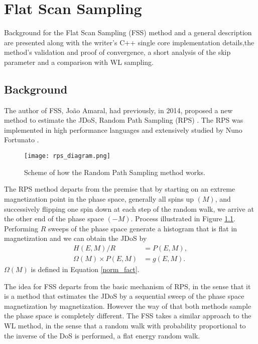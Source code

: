 \chapter{Flat Scan Sampling}

	Background for the Flat Scan Sampling (FSS) method and a general description are presented along with the writer's C++ single core implementation details,the method's validation and proof of convergence, a short analysis of the skip parameter and a comparison with WL sampling.

\section{Background}

	The author of FSS, João Amaral, had previously, in 2014, proposed a new method to estimate the JDoS, Random Path Sampling (RPS) \cite{Amaral2014}.  The RPS was implemented in high performance languages and extensively studied by Nuno Fortunato \cite{Fortunato2015,Fortunato2016,Korotana2016}. 
	
\begin{figure}[h]
	\centering
	\texttt{[image: rps\_diagram.png]}
	\caption{Scheme of how the Random Path Sampling method works.}
	\label{rps_dia}
\end{figure}
	
	The RPS method departs from the premise that by starting on an extreme magnetization point in the phase space, generally all spins up $(M)$, and successively flipping one spin down at each step of the random walk, we arrive at the other end of the phase space $(-M)$. Process illustrated in Figure \ref{rps_dia}. Performing $R$ sweeps of the phase space generate a histogram that is flat in magnetization and we can obtain the JDoS by 
\begin{align}
	H(E, M)/R &= P(E, M), \\
	\Omega(M) \times P(E, M) &= g(E, M).
\end{align}
$\Omega(M)$ is defined in Equation \ref{norm_fact}.

	The idea for FSS departs from the basic mechanism of RPS, in the sense that it is a method that estimates the JDoS by a sequential sweep of the phase space magnetization by magnetization. However the way of that both methods sample the phase space is completely different. The FSS takes a similar approach to the WL method, in the sense that a random walk with probability proportional to the inverse of the DoS is performed, a flat energy random walk.
	

